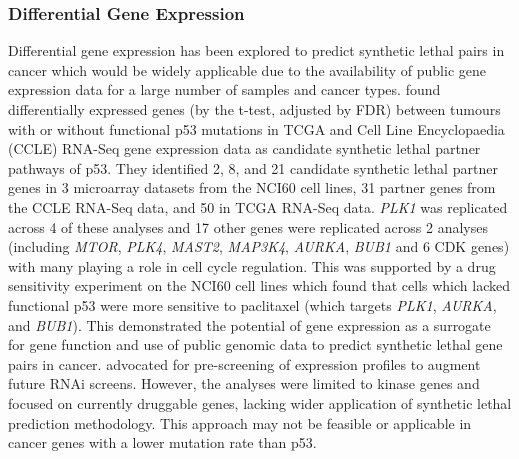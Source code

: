 \subsubsection{Differential Gene Expression}

Differential gene expression has been explored to predict synthetic lethal pairs in cancer which would be widely applicable due to the availability of public gene expression data for a large number of samples and cancer types. \citet{Wang2013} found differentially expressed genes (by the t-test, adjusted by FDR) between tumours with or without functional p53 mutations in TCGA \citep{TCGA2008GBM} and Cell Line Encyclopaedia (CCLE) \citep{Barretina2012} RNA-Seq gene expression data as candidate synthetic lethal partner pathways of p53. They identified 2, 8, and 21 candidate synthetic lethal partner genes in 3 microarray datasets from the NCI60 cell lines, 31 partner genes from the CCLE RNA-Seq data, and 50 in TCGA RNA-Seq data. \textit{PLK1} was replicated across 4 of these analyses and 17 other genes were replicated across 2 analyses (including \textit{MTOR}, \textit{PLK4}, \textit{MAST2}, \textit{MAP3K4}, \textit{AURKA}, \textit{BUB1} and 6 CDK genes) with many playing a role in cell cycle regulation. This was supported by a drug sensitivity experiment on the NCI60 cell lines which found that cells which lacked functional p53 were more sensitive to paclitaxel (which targets \textit{PLK1}, \textit{AURKA}, and \textit{BUB1}). This demonstrated the potential of gene expression as a surrogate for gene function and use of public genomic data to predict synthetic lethal gene pairs in cancer. \citet{Wang2013} advocated for pre-screening of expression profiles to augment future RNAi screens. However, the analyses were limited to kinase genes and focused on currently druggable genes, lacking wider application of synthetic lethal prediction methodology. This approach may not be feasible or applicable in cancer genes with a lower mutation rate than p53.  

